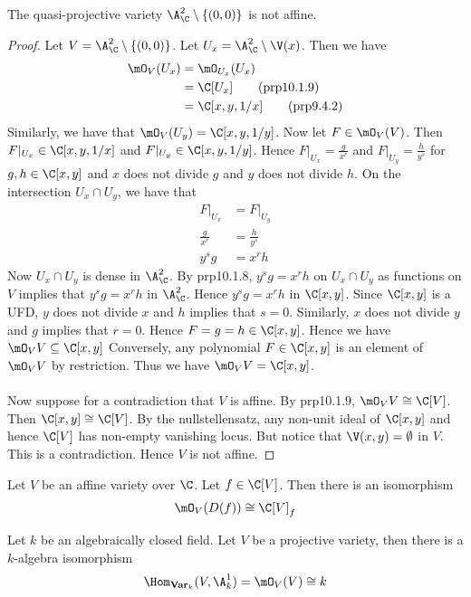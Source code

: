 \documentclass[a4paper]{article}
\begin{document}
\begin{eg}{}{} The quasi-projective variety $\A_\C^2\setminus\{(0,0)\}$ is not affine. 
\begin{proof}
Let $V=\A_\C^2\setminus\{(0,0)\}$. Let $U_x=\A_\C^2\setminus\V(x)$. Then we have 
\begin{align*}
\mO_V(U_x)&=\mO_{U_x}(U_x)\\
&=\C[U_x]\tag{prp10.1.9}\\
&=\C[x,y,1/x]\tag{prp9.4.2}
\end{align*}
Similarly, we have that $\mO_V(U_y)=\C[x,y,1/y]$. Now let $F\in\mO_V(V)$. Then $F|_{U_x}\in\C[x,y,1/x]$ and $F|_{U_y}\in\C[x,y,1/y]$. Hence $F|_{U_x}=\frac{g}{x^r}$ and $F|_{U_y}=\frac{h}{y^s}$ for $g,h\in\C[x,y]$ and $x$ does not divide $g$ and $y$ does not divide $h$. On the intersection $U_x\cap U_y$, we have that 
\begin{align*}
F|_{U_x}&=F|_{U_y}\\
\frac{g}{x^r}&=\frac{h}{y^s}\\
y^sg&=x^rh
\end{align*}
Now $U_x\cap U_y$ is dense in $\A_\C^2$. By prp10.1.8, $y^sg=x^rh$ on $U_x\cap U_y$ as functions on $V$ implies that $y^sg=x^rh$ in $\A_\C^2$. Hence $y^sg=x^rh$ in $\C[x,y]$. Since $\C[x,y]$ is a UFD, $y$ does not divide $x$ and $h$ implies that $s=0$. Similarly, $x$ does not divide $y$ and $g$ implies that $r=0$. Hence $F=g=h\in\C[x,y]$. Hence we have $\mO_VV\subseteq\C[x,y]$ Conversely, any polynomial $F\in\C[x,y]$ is an element of $\mO_VV$ by restriction. Thus we have $\mO_VV=\C[x,y]$. \\~\\

Now suppose for a contradiction that $V$ is affine. By prp10.1.9, $\mO_VV\cong\C[V]$. Then $\C[x,y]\cong\C[V]$. By the nullstellensatz, any non-unit ideal of $\C[x,y]$ and hence $\C[V]$ has non-empty vanishing locus. But notice that $\V(x,y)=\emptyset$ in $V$. This is a contradiction. Hence $V$ is not affine. 
\end{proof}
\end{eg}

\begin{prp}{}{} Let $V$ be an affine variety over $\C$. Let $f\in\C[V]$. Then there is an isomorphism $$\mO_V(D(f))\cong\C[V]_f$$
\end{prp}

\begin{prp}{}{} Let $k$ be an algebraically closed field. Let $V$ be a projective variety, then there is a $k$-algebra isomorphism $$\Hom_{\bold{Var}_k}(V,\A_k^1)=\mO_V(V)\cong k$$
\end{prp}
\end{document}
